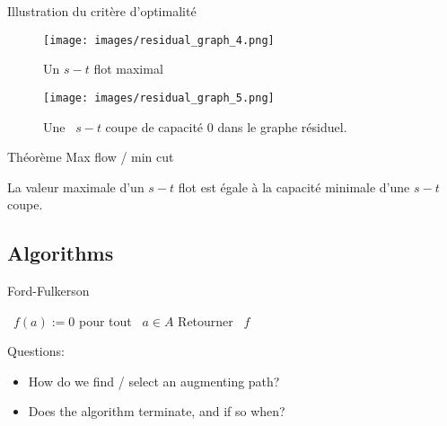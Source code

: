 \documentclass{beamer}
\begin{document}
\begin{frame}{Illustration du critère d'optimalité} \pause
  \begin{figure}
    \begin{minipage}{0.65\linewidth}
      \texttt{[image: images/residual\_graph\_4.png]}
    \end{minipage}
    \begin{minipage}{0.3\linewidth}
      \caption{Un $s-t$ flot maximal}
    \end{minipage}
  \end{figure}
  \vfill \pause
  \begin{figure}
    \begin{minipage}{0.65\linewidth}
      \texttt{[image: images/residual\_graph\_5.png]}
    \end{minipage}
    \begin{minipage}{0.3\linewidth}
      \caption{Une ~$s-t$ coupe de capacité $0$ dans le graphe résiduel.}
    \end{minipage}
  \end{figure}
\end{frame}

\begin{frame}[t]{Théorème Max flow / min cut} \pause
  \begin{theorem}[6.5]
    La valeur maximale d'un $s-t$ flot est égale à la capacité minimale d'une $s-t$ coupe. 
  \end{theorem}
\end{frame}

\subsection{Algorithms}

\begin{frame}[t]{Ford-Fulkerson}
  \setcounter{algocf}{4}
  \begin{algorithm}[H]
        \caption{Algorithme de Ford-Fulkerson}
   \SetAlgoLined 
   ~$f(a):= 0$ pour tout ~$a \in A$\; \pause
    \pause
   Retourner ~$f$
  \end{algorithm}
  \vfill \pause
  Questions: \pause
  \begin{itemize}
    \item How do we find / select an augmenting path? \pause
    \item Does the algorithm terminate, and if so when?
  \end{itemize}
\end{frame}
\end{document}
